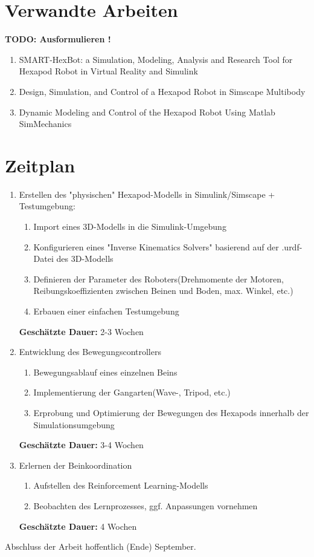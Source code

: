 \section{Verwandte Arbeiten}
\textbf{TODO: Ausformulieren !}
\begin{enumerate}

\item SMART-HexBot: a Simulation, Modeling, Analysis and
Research Tool for Hexapod Robot in Virtual Reality and
Simulink

\item Design, Simulation, and Control of a Hexapod Robot in
Simscape Multibody

\item Dynamic Modeling and Control of the Hexapod Robot Using Matlab SimMechanics

\end{enumerate}


\section{Zeitplan}
\begin{enumerate}
	\item Erstellen des "physischen" Hexapod-Modells in Simulink/Simscape + Testumgebung:
	\begin{enumerate}[label*=\arabic*.]
		\item Import eines 3D-Modells in die Simulink-Umgebung
		\item Konfigurieren eines "Inverse Kinematics Solvers" basierend auf der .urdf-Datei des 3D-Modells
		\item Definieren der Parameter des Roboters(Drehmomente der Motoren, Reibungskoeffizienten zwischen Beinen und Boden, max. Winkel, etc.)
		\item Erbauen einer einfachen Testumgebung
	\end{enumerate}
	\textbf{Geschätzte Dauer:} 2-3 Wochen
	
	\item Entwicklung des Bewegungscontrollers
	\begin{enumerate}[label*=\arabic*.]
		\item Bewegungsablauf eines einzelnen Beins
		\item Implementierung der Gangarten(Wave-, Tripod, etc.)	
		\item Erprobung und Optimierung der Bewegungen des Hexapods innerhalb der Simulationsumgebung
	\end{enumerate}
	\textbf{Geschätzte Dauer:} 3-4 Wochen
	
	\item Erlernen der Beinkoordination
	\begin{enumerate}[label*=\arabic*.]
		\item Aufstellen des Reinforcement Learning-Modells
		\item Beobachten des Lernprozesses, ggf. Anpassungen vornehmen
	\end{enumerate}
	\textbf{Geschätzte Dauer:} 4 Wochen
	

\end{enumerate}


Abschluss der Arbeit hoffentlich (Ende) September.